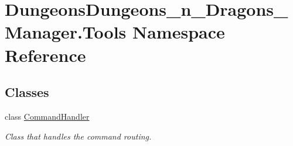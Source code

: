 \hypertarget{namespace_dungeons_dungeons__n___dragons___manager_1_1_tools}{}\section{Dungeons\+Dungeons\+\_\+n\+\_\+\+Dragons\+\_\+\+Manager.\+Tools Namespace Reference}
\label{namespace_dungeons_dungeons__n___dragons___manager_1_1_tools}
\subsection*{Classes}
\begin{DoxyCompactItemize}
\item 
class \mbox{\hyperlink{class_dungeons_dungeons__n___dragons___manager_1_1_tools_1_1_command_handler}{Command\+Handler}}
\begin{DoxyCompactList}\small\item\em Class that handles the command routing. \end{DoxyCompactList}\end{DoxyCompactItemize}

